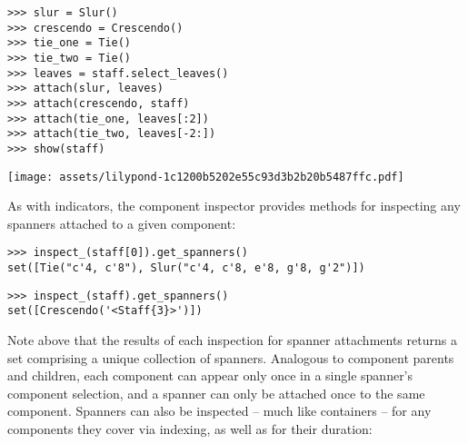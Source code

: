 \begin{abjadbookoutput}
\begin{singlespacing}
\vspace{-0.5\baselineskip}
\begin{verbatim}
>>> slur = Slur()
>>> crescendo = Crescendo()
>>> tie_one = Tie()
>>> tie_two = Tie()
>>> leaves = staff.select_leaves()
>>> attach(slur, leaves)
>>> attach(crescendo, staff)
>>> attach(tie_one, leaves[:2])
>>> attach(tie_two, leaves[-2:])
>>> show(staff)
\end{verbatim}
\noindent\texttt{[image: assets/lilypond-1c1200b5202e55c93d3b2b20b5487ffc.pdf]}
\end{singlespacing}
\end{abjadbookoutput}

\noindent As with indicators, the component inspector provides methods for
inspecting any spanners attached to a given component:

\begin{comment}
<abjad>
inspect_(staff[0]).get_spanners()
inspect_(staff).get_spanners()
</abjad>
\end{comment}

\begin{abjadbookoutput}
\begin{singlespacing}
\vspace{-0.5\baselineskip}
\begin{verbatim}
>>> inspect_(staff[0]).get_spanners()
set([Tie("c'4, c'8"), Slur("c'4, c'8, e'8, g'8, g'2")])
\end{verbatim}
\begin{verbatim}
>>> inspect_(staff).get_spanners()
set([Crescendo('<Staff{3}>')])
\end{verbatim}
\end{singlespacing}
\end{abjadbookoutput}

\noindent Note above that the results of each inspection for spanner
attachments returns a set comprising a unique collection of spanners. Analogous
to component parents and children, each component can appear only once in a
single spanner's component selection, and a spanner can only be attached once
to the same component. Spanners can also be inspected -- much like containers
-- for any components they cover via indexing, as well as for their duration:

\begin{comment}
<abjad>
len(slur)
slur[1]
slur[:]
inspect_(slur).get_duration()
</abjad>
\end{comment}


